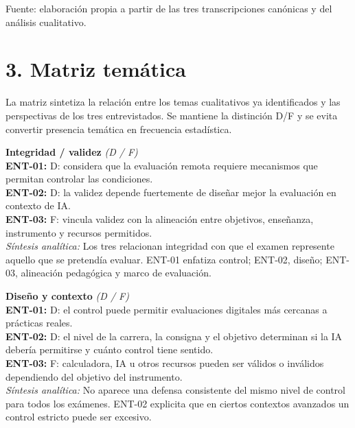Fuente: elaboración propia a partir de las tres transcripciones canónicas y del análisis cualitativo.

\section*{3. Matriz temática}
La matriz sintetiza la relación entre los temas cualitativos ya identificados y las perspectivas de los tres entrevistados. Se mantiene la distinción D/F y se evita convertir presencia temática en frecuencia estadística.

\begin{center}\footnotesize
\begin{infobox}
\textbf{\textcolor{accent}{Integridad / validez}} \textit{(D / F)}\\
\textbf{ENT-01:} D: considera que la evaluación remota requiere mecanismos que permitan controlar las condiciones.\\
\textbf{ENT-02:} D: la validez depende fuertemente de diseñar mejor la evaluación en contexto de IA.\\
\textbf{ENT-03:} F: vincula validez con la alineación entre objetivos, enseñanza, instrumento y recursos permitidos.\\
\textit{Síntesis analítica:} Los tres relacionan integridad con que el examen represente aquello que se pretendía evaluar. ENT-01 enfatiza control; ENT-02, diseño; ENT-03, alineación pedagógica y marco de evaluación.
\end{infobox}
\vspace{2pt}
\begin{infobox}
\textbf{\textcolor{accent}{Diseño y contexto}} \textit{(D / F)}\\
\textbf{ENT-01:} D: el control puede permitir evaluaciones digitales más cercanas a prácticas reales.\\
\textbf{ENT-02:} D: el nivel de la carrera, la consigna y el objetivo determinan si la IA debería permitirse y cuánto control tiene sentido.\\
\textbf{ENT-03:} F: calculadora, IA u otros recursos pueden ser válidos o inválidos dependiendo del objetivo del instrumento.\\
\textit{Síntesis analítica:} No aparece una defensa consistente del mismo nivel de control para todos los exámenes. ENT-02 explicita que en ciertos contextos avanzados un control estricto puede ser excesivo.
\end{infobox}
\vspace{2pt}
\begin{infobox}

\end{infobox}
\end{center}
